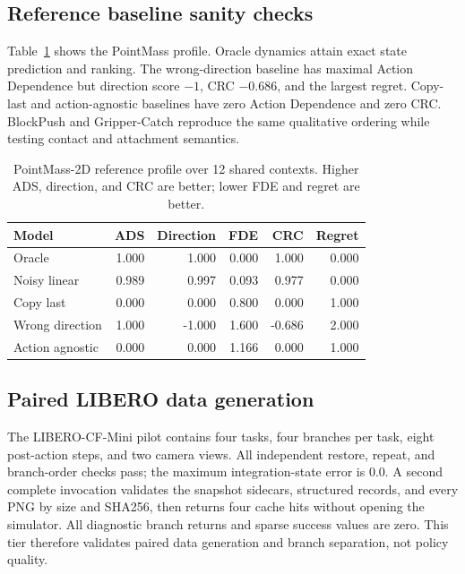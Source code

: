 \documentclass[10pt]{article}
\begin{document}
\subsection{Reference baseline sanity checks}

Table~\ref{tab:pointmass} shows the PointMass profile. Oracle dynamics attain exact state
prediction and ranking. The wrong-direction baseline has maximal Action Dependence but
direction score $-1$, CRC $-0.686$, and the largest regret. Copy-last and action-agnostic
baselines have zero Action Dependence and zero CRC. BlockPush and Gripper-Catch reproduce
the same qualitative ordering while testing contact and attachment semantics.

\begin{table}[t]
\centering
\small
\caption{PointMass-2D reference profile over 12 shared contexts. Higher ADS, direction,
and CRC are better; lower FDE and regret are better.}
\label{tab:pointmass}
\begin{tabular}{lrrrrr}
\toprule
Model & ADS & Direction & FDE & CRC & Regret \\
\midrule
Oracle & 1.000 & 1.000 & 0.000 & 1.000 & 0.000 \\
Noisy linear & 0.989 & 0.997 & 0.093 & 0.977 & 0.000 \\
Copy last & 0.000 & 0.000 & 0.800 & 0.000 & 1.000 \\
Wrong direction & 1.000 & -1.000 & 1.600 & -0.686 & 2.000 \\
Action agnostic & 0.000 & 0.000 & 1.166 & 0.000 & 1.000 \\
\bottomrule
\end{tabular}
\end{table}

\subsection{Paired LIBERO data generation}

The LIBERO-CF-Mini pilot contains four tasks, four branches per task, eight post-action
steps, and two camera views. All independent restore, repeat, and branch-order checks pass;
the maximum integration-state error is 0.0. A second complete invocation validates the
snapshot sidecars, structured records, and every PNG by size and SHA256, then returns four
cache hits without opening the simulator. All diagnostic branch returns and sparse success
values are zero. This tier therefore validates paired data generation and branch
separation, not policy quality.
\end{document}
